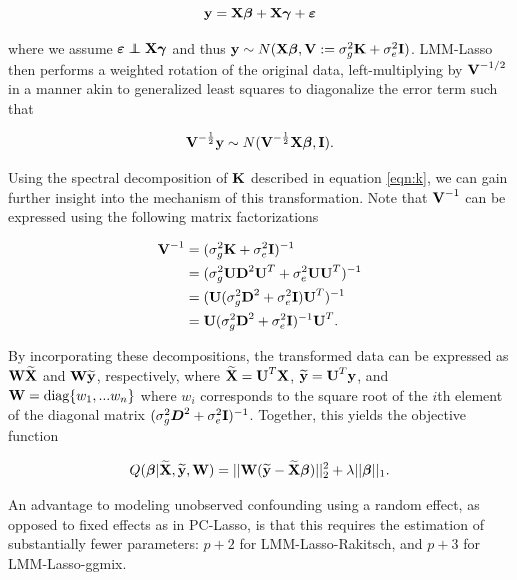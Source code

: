 \begin{equation}
    \label{eqn:lmm_reg}
    \textbf{y} = \textbf{X}\boldsymbol{\beta} + \textbf{X}\boldsymbol{\gamma}+ \boldsymbol{\varepsilon}
\end{equation}

where we assume $\beps \independent \bX\bgamma$ and thus $\textbf{y}  \sim N(\textbf{X} \boldsymbol{\beta}, \textbf{V} := \sigma^2_g \textbf{K} + \sigma^2_e \textbf{I})$. LMM-Lasso then performs a weighted rotation of the original data, left-multiplying by $\textbf{V}^{-1/2}$ in a manner akin to generalized least squares to diagonalize the error term such that

\begin{equation}
\textbf{V}^{-\frac{1}{2}}\textbf{y} \sim N(\textbf{V}^{-\frac{1}{2}}\textbf{X} \boldsymbol{\beta}, \textbf{I}).
\end{equation}


Using the spectral decomposition of $\textbf{K}$ described in equation \ref{eqn:k}, we can gain further insight into the mechanism of this transformation. Note that $\textbf{V}^{-1}$ can be expressed using the following matrix factorizations

\begin{align*}
    \textbf{V}^{-1} &= (\sigma^2_g \textbf{K} + \sigma^2_e \textbf{I})^{-1}\\
    &=(\sigma^2_g \textbf{U} \textbf{D}^2 \textbf{U}^T + \sigma^2_e \textbf{U} \textbf{U}^T)^{-1}\\
    &= (\textbf{U} (\sigma^2_g \textbf{D}^2 + \sigma^2_e \textbf{I}) \textbf{U}^T)^{-1}\\
    &=\textbf{U} (\sigma^2_g \textbf{D}^2 + \sigma^2_e \textbf{I})^{-1} \textbf{U}^T.
\end{align*}

\noindent By incorporating these decompositions, the transformed data can be expressed as $\textbf{W} \widetilde{\textbf{X}}$ and $\textbf{W} \widetilde{\textbf{y}}$, respectively, where $\widetilde{\textbf{X}} = \textbf{U}^T \textbf{X}$, $\widetilde{\textbf{y}} = \textbf{U}^T \textbf{y}$, and $\textbf{W} = \text{diag}\{w_1, ... w_n\}$ where $w_i$ corresponds to the square root of the $i$th element of the diagonal matrix $(\sigma^2_g \boldsymbol{D}^2 + \sigma^2_e \textbf{I})^{-1}$. Together, this yields the objective function

\begin{equation}
\label{eqn:lmm_obj}
Q(\boldsymbol{\beta} | \widetilde{\textbf{X}}, \widetilde{\textbf{y}}, \textbf{W}) = || \textbf{W} (\widetilde{\textbf{y}} - \widetilde{\textbf{X}} \boldsymbol{\beta})||_2^2 + \lambda || \boldsymbol{\beta} ||_1.
\end{equation}

An advantage to modeling unobserved confounding using a random effect, as opposed to fixed effects as in PC-Lasso, is that this requires the estimation of substantially fewer parameters: $p + 2$ for LMM-Lasso-Rakitsch, and $p + 3$ for LMM-Lasso-ggmix. 


